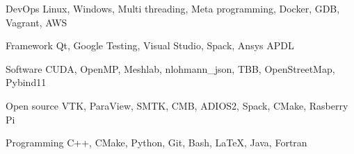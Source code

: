 

\begin{cvskills}

  \cvskill
    {DevOps} %
    {Linux, Windows, Multi threading, Meta programming, Docker, GDB, Vagrant, AWS} %

  \cvskill
    {Framework} %
    {Qt, Google Testing, Visual Studio, Spack, Ansys APDL} %

  \cvskill
    {Software} %
    {CUDA, OpenMP, Meshlab, nlohmann\_json, TBB, OpenStreetMap, Pybind11} %

  \cvskill
    {Open source} %
    {VTK, ParaView, SMTK, CMB, ADIOS2, Spack, CMake, Rasberry Pi} %

  \cvskill
    {Programming} %
    {C++, CMake, Python, Git, Bash, LaTeX, Java, Fortran} %

\end{cvskills}
